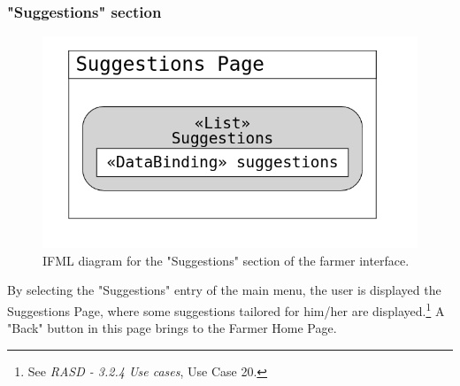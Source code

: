 \documentclass{article}
\begin{document}
\subsubsection{"Suggestions" section}
\begin{figure}[H]
    \centering
     \includegraphics[scale=0.2]{diagrams/ui diagrams/farmer/suggestions.png}
    \caption{IFML diagram for the "Suggestions" section of the farmer interface.}
\end{figure}
By selecting the "Suggestions" entry of the main menu, the user is displayed the Suggestions Page, where some suggestions tailored for him/her are displayed.\footnote{See \textit{RASD - 3.2.4 Use cases}, Use Case 20.}
A "Back" button in this page brings to the Farmer Home Page.
\end{document}
